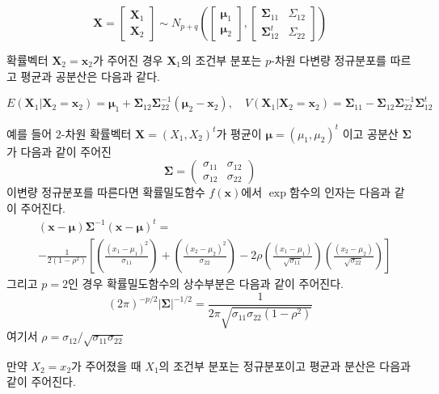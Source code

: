 \documentclass[
  10pt,
]{book}
\theoremstyle{definition}
\theoremstyle{definition}
\theoremstyle{definition}
\theoremstyle{definition}
\theoremstyle{remark}
\begin{document}
\[  \bm X =
    \begin{bmatrix}
  \bm X_1 \\
  \bm X_2
  \end{bmatrix}
  \sim
  N_{p+q} \left (
    \begin{bmatrix}
    \bm \mu_1 \\
    \bm \mu_2
    \end{bmatrix}
    ,\begin{bmatrix}
    \bm \Sigma_{11} & \Sigma_{12} \\
    \bm \Sigma^t_{12} & \Sigma_{22}
    \end{bmatrix}
    \right )
  \]

확률벡터 \(\bm X_2 = \bm x_2\)가 주어진 경우 \(\bm X_1\)의 조건부 분포는 \(p\)-차원 다변량 정규분포를 따르고 평균과 공분산은 다음과 같다.

\[ 
  E(\bm X_1 | \bm X_2 = \bm x_2 ) = \bm \mu_1 + \bm \Sigma_{12} \bm \Sigma^{-1}_{22} (\bm \mu_2 - \bm x_2), \quad
  V(\bm X_1 | \bm X_2 = \bm x_2 )  = \bm \Sigma_{11} -\bm \Sigma_{12} \bm \Sigma^{-1}_{22} \bm \Sigma^t_{12}
  \]

예를 들어 \(2\)-차원 확률벡터 \(\bm X=(X_1, X_2)^t\)가 평균이 \(\bm \mu=(\mu_1,\mu_2)^t\) 이고
공분산 \(\bm \Sigma\)가 다음과 같이 주어진
\begin{equation*}
\bm \Sigma =
  \begin{pmatrix}
\sigma_{11} & \sigma_{12} \\
\sigma_{12} & \sigma_{22}
\end{pmatrix}
\end{equation*}
이변량 정규분포를 따른다면 확률밀도함수 \(f(\bm x)\)에서 \(\exp\)함수의 인자는 다음과 같이 주어진다.
\begin{eqnarray*}
&(\bm x-\bm \mu) \bm \Sigma^{-1}(\bm x-\bm \mu)^t
= \\
&-\frac{1}{2 (1-\rho^2)} 
\left [ 
  \left ( \frac{(x_1-\mu_1)^2}{\sigma_{11}} \right )
  +\left ( \frac{(x_2-\mu_2)^2}{\sigma_{22}} \right )
  -2 \rho \left ( \frac{(x_1-\mu_1)}{\sqrt{\sigma_{11}}} \right )
  \left ( \frac{(x_2-\mu_2)}{\sqrt{\sigma_{22}}} \right )
  \right ]
\end{eqnarray*}
그리고 \(p=2\)인 경우 확률밀도함수의 상수부분은 다음과 같이 주어진다.
\[ (2 \pi)^{-p/2} | \bm \Sigma|^{-1/2} = \frac{1}{ 2 \pi \sqrt{\sigma_{11} \sigma_{22} (1-\rho^2)}} \]
여기서 \(\rho = \sigma_{12} / \sqrt{\sigma_{11} \sigma_{22}}\)

만약 \(X_2 = x_2\)가 주어졌을 때 \(X_1\)의 조건부 분포는 정규분포이고 평균과 분산은 다음과 같이 주어진다.
\end{document}
